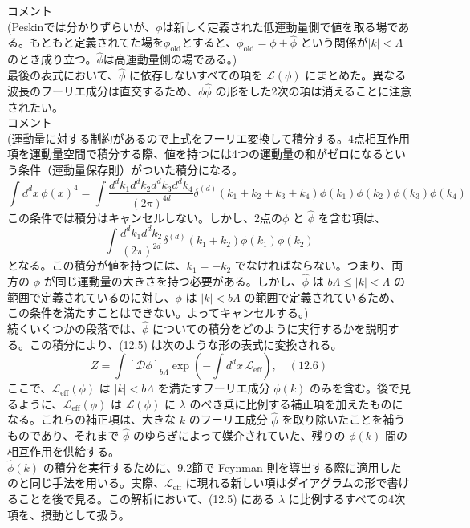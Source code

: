 \documentclass[uplatex,dvipdfmx]{jsarticle}
\begin{document}
コメント\\
(Peskinでは分かりずらいが、$\phi$は新しく定義された低運動量側で値を取る場である。もともと定義されてた場を$\phi_\text{old}$とすると、$\phi_\text{old} = \phi + \hat{\phi}$ という関係が$|k| < \Lambda$ のとき成り立つ。$\hat{\phi}$は高運動量側の場である。)\\
最後の表式において、$\hat{\phi}$ に依存しないすべての項を $\mathcal{L}(\phi)$ にまとめた。異なる波長のフーリエ成分は直交するため、$\phi\hat{\phi}$ の形をした2次の項は消えることに注意されたい。\\
コメント\\
(運動量に対する制約があるので上式をフーリエ変換して積分する。4点相互作用項を運動量空間で積分する際、値を持つには4つの運動量の和がゼロになるという条件（運動量保存則）がついた積分になる。
\begin{equation}
    \int d^d x \, \phi(x)^4=\int \frac{d^d k_1 d^d k_2 d^d k_3 d^d k_4}{(2\pi)^{4d}} \delta^{(d)}(k_1+k_2+k_3+k_4) \phi(k_1) \phi(k_2) \phi(k_3) \phi(k_4)
\end{equation}
この条件では積分はキャンセルしない。しかし、2点の$\phi$ と $\hat{\phi}$ を含む項は、
\begin{equation}
    \int \frac{d^d k_1 d^d k_2}{(2\pi)^{2d}} \delta^{(d)}(k_1+k_2) \phi(k_1) \phi(k_2)
\end{equation}
となる。この積分が値を持つには、$k_1 = -k_2$ でなければならない。つまり、両方の $\phi$ が同じ運動量の大きさを持つ必要がある。しかし、$\hat{\phi}$ は $b\Lambda \le |k| < \Lambda$ の範囲で定義されているのに対し、$\phi$ は $|k| < b\Lambda$ の範囲で定義されているため、この条件を満たすことはできない。よってキャンセルする。)\\
続くいくつかの段落では、$\hat{\phi}$ についての積分をどのように実行するかを説明する。この積分により、(12.5) は次のような形の表式に変換される。
\begin{equation}
    Z = \int [\mathcal{D}\phi]_{b\Lambda} \exp\left( - \int d^d x \, \mathcal{L}_{\text{eff}} \right), \quad (12.6)
\end{equation}
ここで、$\mathcal{L}_{\text{eff}}(\phi)$ は $|k| < b\Lambda$ を満たすフーリエ成分 $\phi(k)$ のみを含む。後で見るように、$\mathcal{L}_{\text{eff}}(\phi)$ は $\mathcal{L}(\phi)$ に $\lambda$ のべき乗に比例する補正項を加えたものになる。これらの補正項は、大きな $k$ のフーリエ成分 $\hat{\phi}$ を取り除いたことを補うものであり、それまで $\hat{\phi}$ のゆらぎによって媒介されていた、残りの $\phi(k)$ 間の相互作用を供給する。\\
$\hat{\phi}(k)$ の積分を実行するために、9.2節で Feynman 則を導出する際に適用したのと同じ手法を用いる。実際、$\mathcal{L}_{\text{eff}}$ に現れる新しい項はダイアグラムの形で書けることを後で見る。この解析において、(12.5) にある $\lambda$ に比例するすべての4次項を、摂動として扱う。\\
\end{document}
